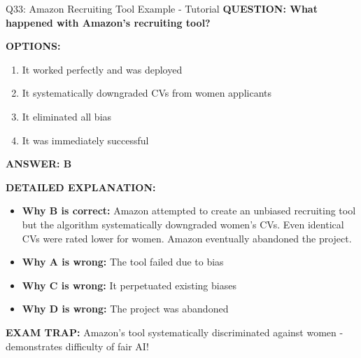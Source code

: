 \documentclass[8pt]{beamer}
\begin{document}
	\begin{frame}{Q33: Amazon Recruiting Tool Example - Tutorial}
		\fontsize{6.5}{7.5}\selectfont
		\textbf{QUESTION: What happened with Amazon's recruiting tool?}
		
		\vspace{0.1cm}
		\textbf{OPTIONS:}
		\begin{enumerate}
			\item It worked perfectly and was deployed
			\item It systematically downgraded CVs from women applicants
			\item It eliminated all bias
			\item It was immediately successful
		\end{enumerate}
		
		\vspace{0.1cm}
		\textcolor{myblue}{\textbf{ANSWER: B}}
		
		\vspace{0.1cm}
		\textbf{DETAILED EXPLANATION:}
		\begin{itemize}
			\item \textbf{Why B is correct:} Amazon attempted to create an unbiased recruiting tool but the algorithm systematically downgraded women's CVs. Even identical CVs were rated lower for women. Amazon eventually abandoned the project.
			\item \textbf{Why A is wrong:} The tool failed due to bias
			\item \textbf{Why C is wrong:} It perpetuated existing biases
			\item \textbf{Why D is wrong:} The project was abandoned
		\end{itemize}
		
		\textcolor{myred}{\textbf{EXAM TRAP:}} Amazon's tool \textcolor{myblue}{systematically discriminated against women} - demonstrates difficulty of fair AI!
	\end{frame}
	
\end{document}
